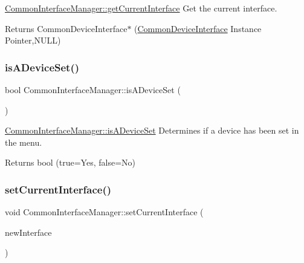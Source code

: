 \hyperlink{class_common_interface_manager_a24a72b0f78f9e6037e2da899e8170b2f}{Common\+Interface\+Manager\+::get\+Current\+Interface} Get the current interface. 

\begin{DoxyReturn}{Returns}
Common\+Device\+Interface$\ast$ (\hyperlink{class_common_device_interface}{Common\+Device\+Interface} Instance Pointer,N\+U\+LL) 
\end{DoxyReturn}
\hypertarget{class_common_interface_manager_abd7a314803309cdb6789eaf36f90b7b7}{}\label{class_common_interface_manager_abd7a314803309cdb6789eaf36f90b7b7} 
\subsubsection{\texorpdfstring{is\+A\+Device\+Set()}{isADeviceSet()}}
{\footnotesize\ttfamily bool Common\+Interface\+Manager\+::is\+A\+Device\+Set (\begin{DoxyParamCaption}{ }\end{DoxyParamCaption})}



\hyperlink{class_common_interface_manager_abd7a314803309cdb6789eaf36f90b7b7}{Common\+Interface\+Manager\+::is\+A\+Device\+Set} Determines if a device has been set in the menu. 

\begin{DoxyReturn}{Returns}
bool (true=Yes, false=No) 
\end{DoxyReturn}
\hypertarget{class_common_interface_manager_add704853a060d8cca441da322b748c19}{}\label{class_common_interface_manager_add704853a060d8cca441da322b748c19} 
\subsubsection{\texorpdfstring{set\+Current\+Interface()}{setCurrentInterface()}}
{\footnotesize\ttfamily void Common\+Interface\+Manager\+::set\+Current\+Interface (\begin{DoxyParamCaption}\item[{\hyperlink{class_common_device_interface}{Common\+Device\+Interface} $\ast$}]{new\+Interface }\end{DoxyParamCaption})}



